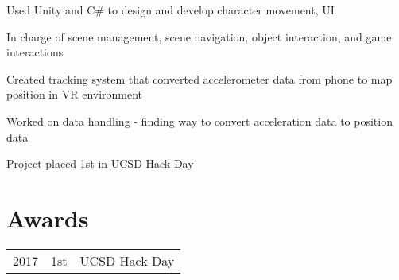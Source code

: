 \documentclass[]{deedy-resume-openfont}
\begin{document}
\begin{minipage}[t]{0.66\textwidth}
\begin{tightemize} 
\item Used Unity and C\# to design and develop character movement, UI
\item In charge of scene management, scene navigation, object interaction, and game interactions
\end{tightemize}
\sectionsep

\begin{tightemize}
\item Created tracking system that converted accelerometer data from phone to map position in VR environment
\item Worked on data handling - finding way to convert acceleration data to position data
\item Project placed 1st in UCSD Hack Day
\end{tightemize}
\sectionsep


\section{Awards} 
\begin{tabular}{rll}
2017	     & 1st  & UCSD Hack Day\\
\end{tabular}
\sectionsep

\end{minipage} 
\end{document}
